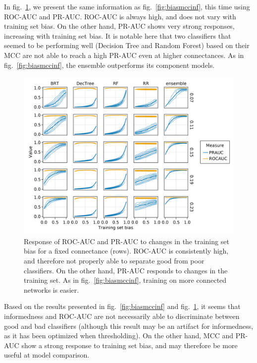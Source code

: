 \documentclass[10pt,oneside]{article}
\makeatletter
\def\maxwidth{\ifdim\Gin@nat@width>\linewidth\linewidth
\else\Gin@nat@width\fi}
\let\Oldincludegraphics\includegraphics
\renewcommand{\includegraphics}[1]{\Oldincludegraphics[width=\maxwidth]{#1}}
\makeatother
\begin{document}
In fig.~\ref{fig:biasrocpr}, we present the same information as
fig.~\ref{fig:biasmccinf}, this time using ROC-AUC and PR-AUC. ROC-AUC
is always high, and does not vary with training set bias. On the other
hand, PR-AUC shows very strong responses, increasing with training set
bias. It is notable here that two classifiers that seemed to be
performing well (Decision Tree and Random Forest) based on their MCC are
not able to reach a high PR-AUC even at higher connectances. As in
fig.~\ref{fig:biasmccinf}, the ensemble outperforms its component
models.

\begin{figure}
\hypertarget{fig:biasrocpr}{%
\centering
\includegraphics{figures/bias_roc_pr.png}
\caption{Response of ROC-AUC and PR-AUC to changes in the training set
bias for a fixed connectance (rows). ROC-AUC is consistently high, and
therefore not properly able to separate good from poor classifiers. On
the other hand, PR-AUC responds to changes in the training set. As in
fig.~\ref{fig:biasmccinf}, training on more connected networks is
easier.}\label{fig:biasrocpr}
}
\end{figure}

Based on the results presented in fig.~\ref{fig:biasmccinf} and
fig.~\ref{fig:biasrocpr}, it seems that informedness and ROC-AUC are not
necessarily able to discriminate between good and bad classifiers
(although this result may be an artifact for informedness, as it has
been optimized when thresholding). On the other hand, MCC and PR-AUC
show a strong response to training set bias, and may therefore be more
useful at model comparison.
\end{document}
